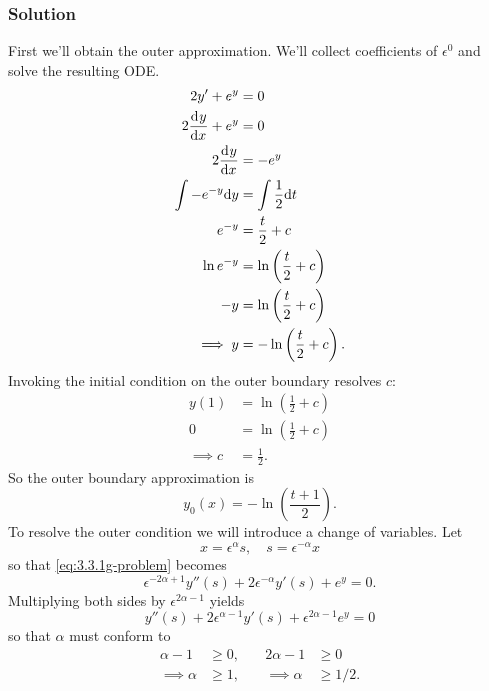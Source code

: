 \documentclass[12pt,twoside]{article}
\begin{document}
\subsubsection*{Solution}
First we'll obtain the outer approximation. We'll collect coefficients of
$\epsilon^0$ and solve the resulting ODE.\@
\begin{equation*}
  \begin{aligned}
    2y'+e^y&=0 \\
    2\frac{\mathrm{d}^{} {y}}{\mathrm{d}{x}^{}}+e^y&=0 \\
    2\frac{\mathrm{d}^{} {y}}{\mathrm{d}{x}^{}} &= -e^y \\
    \int -e^{-y} \mathrm{d}{y} &= \int\frac{1}{2} \mathrm{d}{t} \\
    e^{-y} &= \frac{t}{2}+c \\
    \ln e^{-y} &= \ln\left( \frac{t}{2}+c \right) \\
    -y &= \ln\left( \frac{t}{2}+c \right) \\
    \implies y &= -\ln\left( \frac{t}{2}+c \right).
  \end{aligned}
\end{equation*}
Invoking the initial condition on the outer boundary resolves $c$:
\begin{equation*}
  \begin{aligned}
    y(1) &= \ln\left( \frac{1}{2}+c \right) \\
    0 &= \ln\left( \frac{1}{2}+c \right) \\
    \implies c &= \frac{1}{2}.
  \end{aligned}
\end{equation*}
So the outer boundary approximation is
\begin{equation*}
  \boxed{y_0(x) = -\ln\left( \frac{t+1}{2} \right).}
\end{equation*}
To resolve the outer condition we will introduce a change of variables. Let
\begin{equation*}
  x=\epsilon^{\alpha}s,\quad s=\epsilon^{-\alpha}x
\end{equation*}
so that \cref{eq:3.3.1g-problem} becomes
\begin{equation*}
  \epsilon^{-2\alpha+1}y''(s) + 2\epsilon^{-\alpha}y'(s) + e^y = 0.
\end{equation*}
Multiplying both sides by $\epsilon^{2\alpha-1}$ yields
\begin{equation}
  \label{eq:3.3.1g-ys-alpha}
  y''(s) + 2\epsilon^{\alpha-1}y'(s) + \epsilon^{2\alpha-1}e^y=0
\end{equation}
so that $\alpha$ must conform to
\begin{equation}
  \label{eq:3.3.1g-alpha-conditions}
  \begin{aligned}
    \alpha-1&\ge0, &\quad 2\alpha-1&\ge0 \\
    \implies \alpha&\ge1, &\quad \implies \alpha&\ge1/2. \\
  \end{aligned}
\end{equation}
\end{document}

